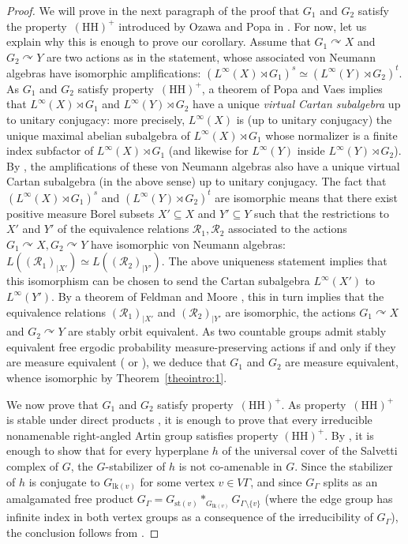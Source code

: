 \documentclass[JEP,XML,SOM,Unicode,NoFloatCountersInSection,published]{cedram}
\let\mathcal\mathscr
\theoremstyle{plain}
\theoremstyle{definition}
\let\actson\curvearrowright
\newcommand{\lk}{\mathrm{lk}}
\newcommand{\st}{\mathrm{st}}
\begin{document}
\begin{proof}
We will prove in the next paragraph of the proof that $G_1$ and $G_2$ satisfy the property~$\mathrm{(HH)}^+$ introduced by Ozawa and Popa in \cite[Def.\,1]{OP}. For now, let us explain why this is enough to prove our corollary. Assume that $G_1\actson X$ and $G_2\actson Y$ are two actions as in the statement, whose associated von Neumann algebras have isomorphic amplifications: $(L^\infty(X)\rtimes G_1)^s\simeq (L^\infty(Y)\rtimes G_2)^t$. As $G_1$ and $G_2$ satisfy property~$\mathrm{(HH)}^+$, a theorem of Popa and Vaes \cite[Th.\,1.2 and Remark~1.3]{PV1} implies that $L^\infty(X)\rtimes G_1$ and $L^\infty(Y)\rtimes G_2$ have a unique \emph{virtual Cartan subalgebra} up to unitary conjugacy: more precisely, $L^{\infty}(X)$ is (up to unitary conjugacy) the unique maximal abelian subalgebra of $L^\infty(X)\rtimes G_1$ whose normalizer is a finite index subfactor of $L^\infty(X)\rtimes G_1$ (and likewise for $L^\infty(Y)$ inside $L^\infty(Y)\rtimes G_2$). By \cite[Prop.\,4.12]{OP1}, the amplifications of these von Neumann algebras also have a unique virtual Cartan subalgebra (in the above sense) up to unitary conjugacy. The fact that $(L^\infty(X)\rtimes G_1)^s$ and $(L^\infty(Y)\rtimes G_2)^t$ are isomorphic means that there exist positive measure Borel subsets $X'\subseteq X$ and $Y'\subseteq Y$ such that the restrictions to $X'$ and $Y'$ of the equivalence relations $\mathcal{R}_1,\mathcal{R}_2$ associated to the actions $G_1\actson X,G_2\actson Y$ have isomorphic von Neumann algebras: $L((\mathcal{R}_1)_{|X'})\simeq L((\mathcal{R}_2)_{|Y'})$. The above uniqueness statement implies that this isomorphism can be chosen to send the Cartan subalgebra $L^\infty(X')$ to $L^\infty(Y')$. By a theorem of Feldman and Moore \cite{FM}, this in turn implies that the equivalence relations $(\mathcal{R}_1)_{|X'}$ and $(\mathcal{R}_2)_{|Y'}$ are isomorphic, \ie the actions $G_1\actson X$ and $G_2\actson Y$ are stably orbit equivalent. As two countable groups admit stably equivalent free ergodic probability measure-preserving actions if and only if they are measure equivalent (\cf \cite[Th.\,3.3]{Fur2} or \cite[Th.\,2.3]{Gab2}), we deduce that $G_1$ and $G_2$ are measure equivalent, whence isomorphic by Theorem~\ref{theointro:1}.

We now prove that $G_1$ and $G_2$ satisfy property~$\mathrm{(HH)}^+$. As property~$\mathrm{(HH)}^+$ is stable under direct products \cite[Th.\,2.3(2)]{OP}, it is enough to prove that every irreducible nonamenable right-angled Artin group satisfies property $\mathrm{(HH)}^+$. By \cite[Th.\,2.3(5)]{OP}, it is enough to show that for every hyperplane $h$ of the universal cover of the Salvetti complex of $G$, the $G$-stabilizer of $h$ is not co-amenable in $G$. Since the stabilizer of $h$ is conjugate to $G_{\lk(v)}$ for some vertex $v\in V\Gamma$, and since $G_\Gamma$ splits as an amalgamated free product $G_\Gamma=G_{\st(v)}\ast_{G_{\lk(v)}}G_{\Gamma\setminus\{v\}}$ (where the edge group has infinite index in both vertex groups as a consequence of the irreducibility of $G_\Gamma$), the conclusion follows from \cite[Lem.\,2.4]{CE}.
\end{proof}
\end{document}
